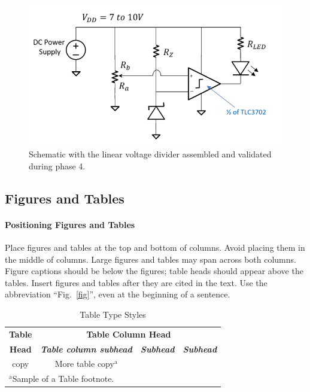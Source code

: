 \documentclass[conference]{IEEEtran}
\begin{document}
\begin{figure}[htbp]
\centerline{\includegraphics{./images/circuit4.png}}
\caption{Schematic with the linear voltage divider assembled and validated during phase 4. \cite{week7}}
\label{circuit4}
\end{figure}


\subsection{Figures and Tables}
\paragraph{Positioning Figures and Tables} Place figures and tables at the top and 
bottom of columns. Avoid placing them in the middle of columns. Large 
figures and tables may span across both columns. Figure captions should be 
below the figures; table heads should appear above the tables. Insert 
figures and tables after they are cited in the text. Use the abbreviation 
``Fig.~\ref{fig}'', even at the beginning of a sentence.

\begin{table}[htbp]
\caption{Table Type Styles}
\begin{center}
\begin{tabular}{|c|c|c|c|}
\hline
\textbf{Table}&\multicolumn{3}{|c|}{\textbf{Table Column Head}} \\
\cline{2-4} 
\textbf{Head} & \textbf{\textit{Table column subhead}}& \textbf{\textit{Subhead}}& \textbf{\textit{Subhead}} \\
\hline
copy& More table copy$^{\mathrm{a}}$& &  \\
\hline
\multicolumn{4}{l}{$^{\mathrm{a}}$Sample of a Table footnote.}
\end{tabular}
\label{tab1}
\end{center}
\end{table}
\end{document}
